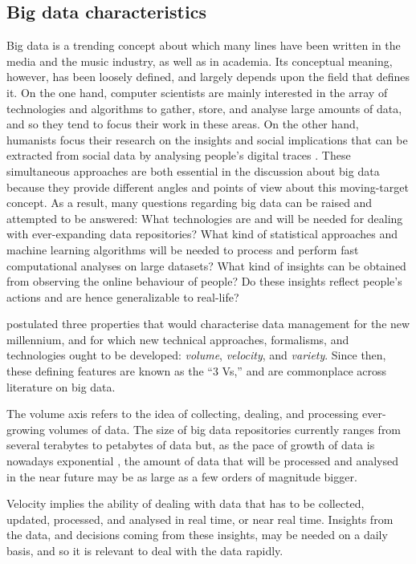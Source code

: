 \subsection{Big data characteristics}\label{sec:3-big-data-characteristics}
Big data is a trending concept about which many lines have been written in the media and the music industry, as well as in academia. Its conceptual meaning, however, has been loosely defined, and largely depends upon the field that defines it. 
On the one hand, computer scientists are mainly interested in the array of technologies and algorithms to gather, store, and analyse large amounts of data, and so they tend to focus their work in these areas. On the other hand, humanists focus their research on the insights and social implications that can be extracted from social data by analysing people's digital traces \autocite{boyd12critical}. 
These simultaneous approaches are both essential in the discussion about big data because they provide different angles and points of view about this moving-target concept.
As a result, many questions regarding big data can be raised and attempted to be answered:
What technologies are and will be needed for dealing with ever-expanding data repositories? 
What kind of statistical approaches and machine learning algorithms will be needed to process and perform fast computational analyses on large datasets?
What kind of insights can be obtained from observing the online behaviour of people? 
Do these insights reflect people's actions and are hence generalizable to real-life?





\textcite{laney013d} postulated three properties that would characterise data management for the new millennium, and for which new technical approach\-es, formalisms, and technologies ought to be developed: \emph{volume}, \emph{velocity}, and \emph{variety}. Since then, these  defining features are known as the ``3 Vs,'' and are commonplace across literature on big data.

The volume axis refers to the idea of collecting, dealing, and processing ever-growing volumes of data. The size of big data repositories currently ranges from several terabytes to petabytes of data but, as the pace of growth of data is nowadays exponential \autocite{hilbert11world}, the amount of data that will be processed and analysed in the near future may  be as large as a few orders of magnitude bigger.

Velocity implies the ability of dealing with data that has to be collected, updated, processed, and analysed in real time, or near real time. Insights from the data, and decisions coming from these insights, may be needed on a daily basis, and so it is relevant to deal with the data rapidly.


